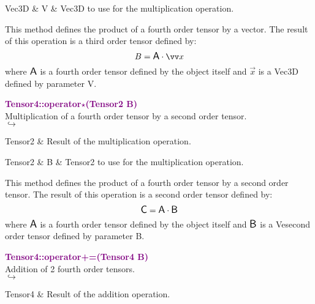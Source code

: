 \begin{tcolorbox}[width=\textwidth,myArgs,tabularx={ll|R}]
Vec3D & V & Vec3D to use for the multiplication operation.
\end{tcolorbox}

This method defines the product of a fourth order tensor by a vector.
The result of this operation is a third order tensor defined by:
\begin{equation*}
B = \A \cdot \overrightarrow{x}
\end{equation*}
where $\mbox{\large\ensuremath{\mathsf{A}}}$ is a fourth order tensor defined by the object itself and $\overrightarrow{x}$ is a Vec3D defined by parameter V.

\textcolor{purple}{\textbf{Tensor4::operator$\star$(Tensor2 B)}}\label{Tensor4::operator*(Tensor2 B)}\\
Multiplication of a fourth order tensor by a second order tensor.\\ \hspace*{5mm}$\hookrightarrow$
\vspace*{-2em}\begin{tcolorbox}[grow to left by=-1cm, width=\textwidth-1cm,myArgs,tabularx={l|R}]
Tensor2 & Result of the multiplication operation.
\end{tcolorbox}

\begin{tcolorbox}[width=\textwidth,myArgs,tabularx={ll|R}]
Tensor2 & B & Tensor2 to use for the multiplication operation.
\end{tcolorbox}

This method defines the product of a fourth order tensor by a second order tensor.
The result of this operation is a second order tensor defined by:
\begin{equation*}
\mbox{\large\ensuremath{\mathsf{C}}} = \mbox{\large\ensuremath{\mathsf{A}}} \cdot \mbox{\large\ensuremath{\mathsf{B}}}
\end{equation*}
where $\mbox{\large\ensuremath{\mathsf{A}}}$ is a fourth order tensor defined by the object itself and $\mbox{\large\ensuremath{\mathsf{B}}}$ is a Vesecond order tensor defined by parameter B.

\textcolor{purple}{\textbf{Tensor4::operator+=(Tensor4 B)}}\label{Tensor4::operator+=(Tensor4 B)}\\
Addition of 2 fourth order tensors.\\ \hspace*{5mm}$\hookrightarrow$
\vspace*{-2em}\begin{tcolorbox}[grow to left by=-1cm, width=\textwidth-1cm,myArgs,tabularx={l|R}]
Tensor4 & Result of the addition operation.
\end{tcolorbox}


